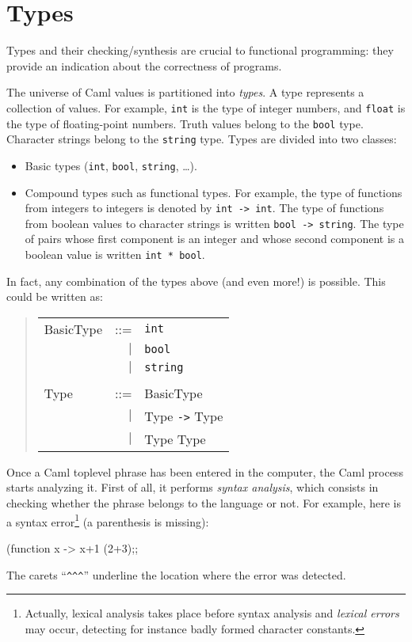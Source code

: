 \section{Types}


Types and their checking/synthesis are crucial to functional
programming:  they provide an indication about the correctness of
programs.

The universe of Caml values is partitioned into {\em types}.
A type represents a collection of values.
For example, \verb|int| is the type of integer numbers, and \verb|float| is the type of floating-point numbers.
Truth values belong to the \verb|bool|
type. Character strings belong to the \verb|string| type. %
%
Types are divided into two classes:
\begin{itemize}
\item
  Basic types (\verb|int|, \verb|bool|, \verb|string|, \ldots).
\item 
  Compound types such as functional types. For example,
  the type of functions from integers to integers is
  denoted by \verb|int -> int|. The type of functions from boolean values to
  character strings is written \verb|bool -> string|. %
The type of pairs
  whose first component is an integer and whose second component is a boolean value
  is written \verb|int * bool|.
\end{itemize}
%
In fact, any combination of the types above (and even more!) is possible.
This could be written as:
\begin{quote}
\begin{tabular}{lrl}
BasicType & ::= & {\tt int} \\
      & $|$ & {\tt bool} \\
      & $|$ & {\tt string} \\
\\
Type & ::= & BasicType \\
     & $|$ & Type \verb|->| Type\\
     & $|$ & Type {\tt *} Type
\end{tabular}
\end{quote}
Once a Caml toplevel phrase has been entered in the computer, the Caml
process starts analyzing it. First of all, it performs {\em
syntax analysis}, which consists in checking whether the phrase
belongs to the language or not. For example, here is a syntax
error\footnote{Actually, lexical analysis takes place before syntax
analysis and {\em lexical errors} may occur, detecting for instance
badly formed character constants.} (a parenthesis is missing):
\begin{caml_example}
(function x -> x+1 (2+3);;
\end{caml_example}
The carets ``\verb|^^^|'' underline the location where the error was
detected.

